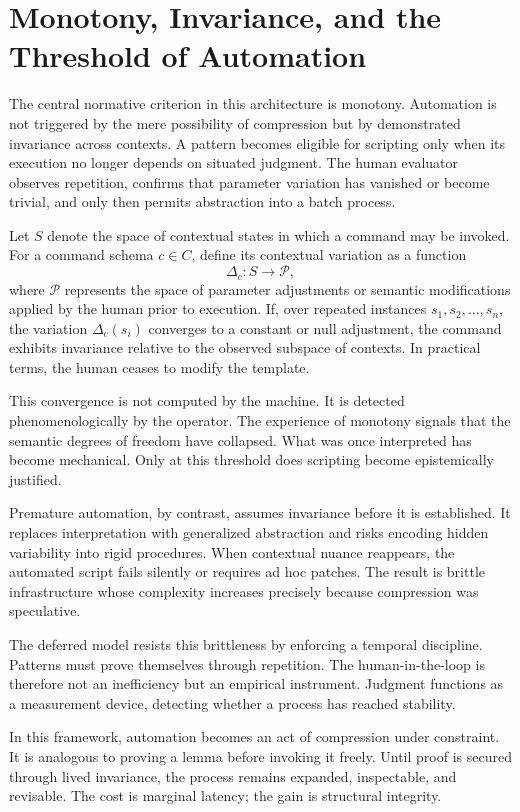 \documentclass[11pt]{article}
\begin{document}
\section{Monotony, Invariance, and the Threshold of Automation}

The central normative criterion in this architecture is monotony. Automation is not triggered by the mere possibility of compression but by demonstrated invariance across contexts. A pattern becomes eligible for scripting only when its execution no longer depends on situated judgment. The human evaluator observes repetition, confirms that parameter variation has vanished or become trivial, and only then permits abstraction into a batch process.

Let \(S\) denote the space of contextual states in which a command may be invoked. For a command schema \(c \in C\), define its contextual variation as a function
\[
\Delta_c : S \to \mathcal{P},
\]
where \(\mathcal{P}\) represents the space of parameter adjustments or semantic modifications applied by the human prior to execution. If, over repeated instances \(s_1, s_2, \dots, s_n\), the variation \(\Delta_c(s_i)\) converges to a constant or null adjustment, the command exhibits invariance relative to the observed subspace of contexts. In practical terms, the human ceases to modify the template.

This convergence is not computed by the machine. It is detected phenomenologically by the operator. The experience of monotony signals that the semantic degrees of freedom have collapsed. What was once interpreted has become mechanical. Only at this threshold does scripting become epistemically justified.

Premature automation, by contrast, assumes invariance before it is established. It replaces interpretation with generalized abstraction and risks encoding hidden variability into rigid procedures. When contextual nuance reappears, the automated script fails silently or requires ad hoc patches. The result is brittle infrastructure whose complexity increases precisely because compression was speculative.

The deferred model resists this brittleness by enforcing a temporal discipline. Patterns must prove themselves through repetition. The human-in-the-loop is therefore not an inefficiency but an empirical instrument. Judgment functions as a measurement device, detecting whether a process has reached stability.

In this framework, automation becomes an act of compression under constraint. It is analogous to proving a lemma before invoking it freely. Until proof is secured through lived invariance, the process remains expanded, inspectable, and revisable. The cost is marginal latency; the gain is structural integrity.
\end{document}
